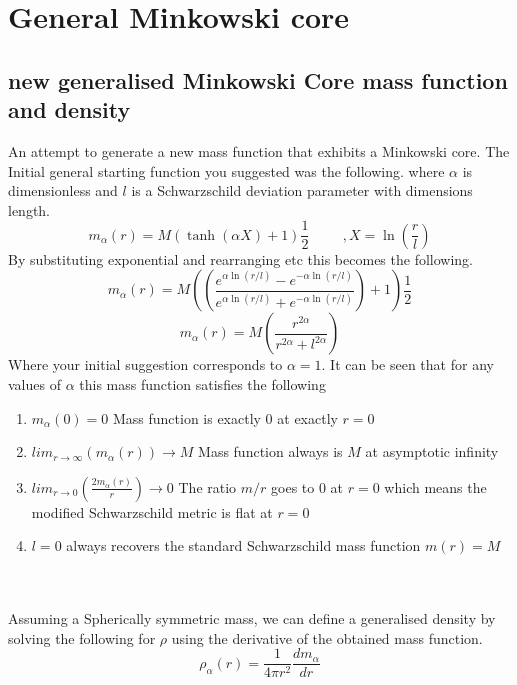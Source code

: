 \documentclass[a4paper,11pt]{article}
\begin{document}
\section{General Minkowski core}
\subsection{new generalised Minkowski Core mass function and density}
An attempt to generate a new mass function that exhibits a Minkowski core. The Initial general starting function you suggested was the following. where $\alpha$ is dimensionless and $l$ is a Schwarzschild deviation parameter with dimensions length.
\begin{equation}
m_{\alpha}(r)=M (\tanh{(\alpha X)}+1)\frac{1}{2} \hspace{1cm}, X=\ln{(\frac{r}{l})}
\end{equation}
By substituting exponential and rearranging etc this becomes the following.
\begin{equation}
m_{\alpha}(r)=M ((\frac{e^{\alpha \ln{(r/l)}}-e^{-\alpha \ln{(r/l)}}}{e^{\alpha \ln{(r/l)}}+e^{-\alpha \ln{(r/l)}}})+1)\frac{1}{2}
\end{equation}
\begin{equation}
m_{\alpha}(r)=M (\frac{r^{2 \alpha}}{r^{2 \alpha}+l^{2 \alpha}})
\end{equation}
Where your initial suggestion corresponds to $\alpha = 1$. It can be seen that for any values of $\alpha$ this mass function satisfies the following
\begin{enumerate}
    \item $m_{\alpha}(0)=0$ Mass function is exactly 0 at exactly $r=0$
    \item $lim_{r \rightarrow \infty } (m_{\alpha}(r)) \rightarrow M$ Mass function always is  $M$ at asymptotic infinity 
    \item $lim_{r \rightarrow 0 } (\frac{2m_{\alpha}(r)}{r}) \rightarrow 0$ The ratio $m/r$ goes to 0 at $r=0$ which means the modified Schwarzschild metric is flat at $r=0$
    \item $l=0$ always recovers the standard Schwarzschild mass function $m(r)=M$
\end{enumerate}
\\
\\
Assuming a Spherically symmetric mass, we can define a generalised density by solving the following for $\rho$ using the derivative of the obtained mass function.
\begin{equation}
\rho_{\alpha}(r)=\frac{1}{4 \pi r^2}\frac{dm_{\alpha}}{dr}
\end{equation}
\end{document}
